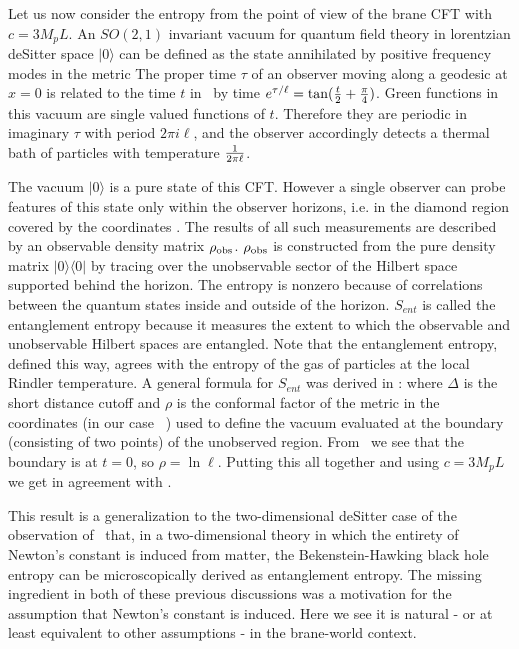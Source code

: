 Let us now consider the entropy from the point of view of the
brane CFT with $c=3M_pL$. An $SO(2,1)$ invariant vacuum for quantum field theory in
lorentzian deSitter space $|0 \rangle $ can be defined as the
state annihilated by positive frequency modes in the metric
\eqn{}
The proper time $\tau$
of an observer moving along a geodesic at
$x=0$ is related to the time $t$ in \dss\ by  time $e^{\tau/\ell} =
\tan({t\over 2}+{\pi \over 4})$.  Green functions in this vacuum
are single valued functions of $t$. Therefore they are periodic in
imaginary $\tau$ with period $2\pi i \ell$, and the observer accordingly
detects a thermal bath of particles with temperature $1 \over 2 \pi  \ell$.

The vacuum $|0 \rangle $ is a pure state
of this CFT. However a single observer can probe features of
this state
only within the observer horizons, i.e. in the diamond
region covered by the coordinates \rtzy. The results of
all such measurements are described by an observable density matrix
$\rho_{\rm obs}$. $\rho_{\rm obs}$ is constructed from the pure density matrix
$|0\rangle \langle 0|$ by tracing over the unobservable sector of the
Hilbert space supported behind the horizon. The entropy
\eqn{}
is nonzero because of correlations between the quantum states inside and
outside of the horizon. $S_{ent}$ is called the entanglement entropy
because it measures the extent to which the observable and unobservable
Hilbert spaces are
entangled. Note that the entanglement entropy, defined this way, agrees 
with the entropy of the gas of particles at the local Rindler temperature. 
 A general formula for $S_{ent}$ was derived in
:
\eqn{}
where $\Delta$ is the  short distance cutoff
and $\rho$ is the conformal factor of the metric in the coordinates (in our
case \dss\ ) used to define the vacuum evaluated at the boundary
(consisting of two points) of the
unobserved region. From \dss\ we see that the boundary is at
$t=0$, so $\rho = \ln \ell$. Putting this all together and using
$c=3M_pL$ we get
\eqn{}
in agreement with  \sfa.




This result is a generalization to the two-dimensional deSitter case of
the observation of \fpst\ that, in a two-dimensional theory in which the
entirety of Newton's constant is induced from matter, the
Bekenstein-Hawking black hole entropy can be microscopically derived as
entanglement entropy.  The missing ingredient in
both of these previous discussions was a motivation for the assumption
that Newton's constant is induced. Here we see it is
natural - or at least equivalent to other assumptions -
in the brane-world context.

